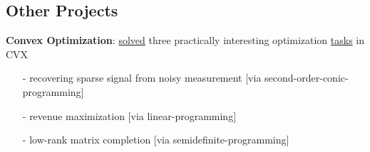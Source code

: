 \documentclass[margin,line]{res}
\begin{document}
\begin{resume}
\section{\sc Other Projects}
\textbf{Convex Optimization}: \href{https://sriramgkn.github.io/reports/CVX_report.pdf}{\sffamily solved} three practically interesting optimization \href{https://sriramgkn.github.io/reports/CVX_Assignment.pdf}{\sffamily tasks} in CVX 
\begin{itemize}
    \item[-]recovering sparse signal from noisy measurement [via second-order-conic-programming]
    \item[-]revenue maximization [via linear-programming]
    \item[-]low-rank matrix completion [via semidefinite-programming]
\end{itemize}




\end{resume}
\end{document}
